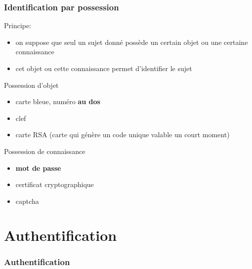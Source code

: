 \begin{reveals}
\begin{frame}
  \vfill

\end{frame}

\begin{frame}
  \frametitle{Identification par possession}

  \vfill

  \begin{block}{Principe:}
    \begin{itemize}
    \item on suppose que seul un sujet donné possède un certain objet
      ou une certaine connaissance
    \item cet objet ou cette connaissance permet d'identifier le sujet
    \end{itemize}
  \end{block}

  \vfill

  \begin{block}{Possession d'objet}
    \begin{itemize}
    \item carte bleue, numéro \textbf{au dos}
    \item clef
    \item carte RSA (carte qui génère un code unique valable un court
      moment)
    \end{itemize}
  \end{block}

  \vfill

  \begin{block}{Possession de connaissance}
    \begin{itemize}
    \item \textbf{mot de passe}
    \item certificat cryptographique
    \item captcha
    \end{itemize}
  \end{block}

\end{frame}

\section{Authentification}

\begin{frame}
  \frametitle{Authentification}

  \vfill


\end{frame}
\end{reveals}
